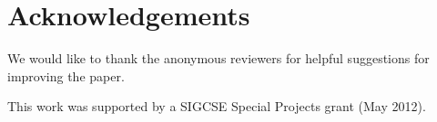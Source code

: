 \documentclass{sig-alternate}
\begin{document}
%
%
%
%
%
%
%
%



  

\section{Acknowledgements}

We would like to thank the anonymous reviewers for helpful suggestions
for improving the paper.

This work was supported by a SIGCSE Special Projects grant (May 2012).
\end{document}
